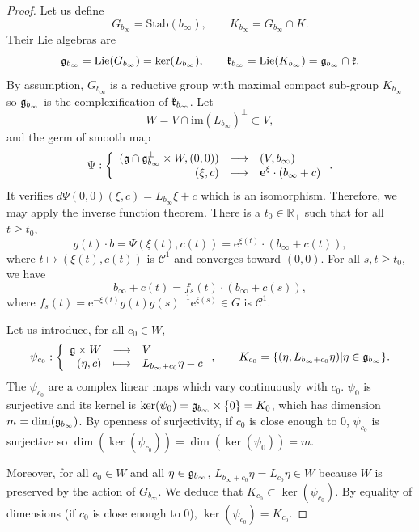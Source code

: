 \documentclass{article}
\theoremstyle{remark}
\theoremstyle{definition}
\newcommand{\R}{\mathbb{R}}
\newcommand{\im}{\mathrm{im}}
\newcommand{\Lie}{\mathrm{Lie}}
\newcommand{\Stab}{\mathrm{Stab}}
\newcommand{\e}{\boldsymbol{\mathrm{e}}}
\newcommand{\mC}{\mathcal{C}}
\renewcommand{\geq}{\geqslant}
\newcommand{\fonction}[4]{\left\{ \begin{array}{rcl}
		\displaystyle #1 & \longrightarrow & \displaystyle #2\\
		\displaystyle #3 & \longmapsto & \displaystyle #4
	\end{array} \right.}
\begin{document}
\begin{proof}
Let us define
$$
G_{b_\infty} = \Stab(b_\infty), \qquad K_{b_\infty} = G_{b_\infty} \cap K.
$$
Their Lie algebras are
$$
\frak{g}_{b_\infty} = \Lie(G_{b_\infty}) = \ker(L_{b_\infty}), \qquad \frak{k}_{b_\infty} = \Lie(K_{b_\infty}) = \frak{g}_{b_\infty} \cap \frak{k}.
$$
By assumption, $G_{b_\infty}$ is a reductive group with maximal compact sub-group $K_{b_\infty}$ so $\frak{g}_{b_\infty}$ is the complexification of $\frak{k}_{b_\infty}$. Let
$$
W = V \cap \im(L_{b_\infty})^\bot \subset V,
$$
and the germ of smooth map
$$
\Psi : \fonction{(\frak{g} \cap \frak{g}_{b_\infty}^\bot \times W,(0,0))}{(V,b_\infty)}{(\xi,c)}{\e^{\xi} \cdot (b_\infty + c)}.
$$
It verifies $d\Psi(0,0)(\xi,c) = L_{b_\infty}\xi + c$ which is an isomorphism. Therefore, we may apply the inverse function theorem. There is a $t_0 \in \R_+$ such that for all $t \geq t_0$,
$$
g(t) \cdot b = \Psi(\xi(t),c(t)) = \e^{\xi(t)} \cdot (b_\infty + c(t)),
$$
where $t \mapsto (\xi(t),c(t))$ is $\mC^1$ and converges toward $(0,0)$. For all $s,t \geq t_0$, we have
\begin{equation}\label{EQ:b_infty + c meme orbite}
    b_\infty + c(t) = f_s(t) \cdot (b_\infty + c(s)),
\end{equation}
where $f_s(t) = \e^{-\xi(t)}g(t)g(s)^{-1}\e^{\xi(s)} \in G$ is $\mC^1$.

Let us introduce, for all $c_0 \in W$,
$$
\psi_{c_0} : \fonction{\frak{g} \times W}{V}{(\eta,c)}{L_{b_\infty + c_0}\eta - c}, \qquad K_{c_0} = \{(\eta,L_{b_\infty + c_0}\eta)|\eta \in \frak{g}_{b_\infty}\}.
$$
The $\psi_{c_0}$ are a complex linear maps which vary continuously with $c_0$. $\psi_0$ is surjective and its kernel is $\ker(\psi_0) = \frak{g}_{b_\infty} \times \{0\} = K_0$, which has dimension $m = \dim(\frak{g}_{b_\infty})$. By openness of surjectivity, if $c_0$ is close enough to $0$, $\psi_{c_0}$ is surjective so $\dim(\ker(\psi_{c_0})) = \dim(\ker(\psi_0)) = m$.

Moreover, for all $c_0 \in W$ and all $\eta \in \frak{g}_{b_\infty}$, $L_{b_\infty + c_0}\eta = L_{c_0}\eta \in W$ because $W$ is preserved by the action of $G_{b_\infty}$. We deduce that $K_{c_0} \subset \ker(\psi_{c_0})$. By equality of dimensions (if $c_0$ is close enough to $0$), $\ker(\psi_{c_0}) = K_{c_0}$.


\end{proof}
\end{document}
